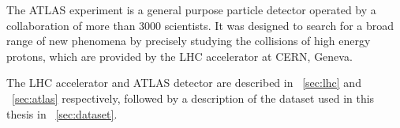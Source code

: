 
The ATLAS experiment is a general purpose particle detector operated by a collaboration of 
more than 3000 scientists. It was designed to search for a broad range of new phenomena by 
precisely studying the collisions of high energy protons, which are provided by the 
\ac{LHC} accelerator at CERN, Geneva.

The \ac{LHC} accelerator and ATLAS detector are described in \Section~\ref{sec:lhc} and 
\Section~\ref{sec:atlas} respectively, followed by a description of the dataset used in 
this thesis in \Section~\ref{sec:dataset}.
